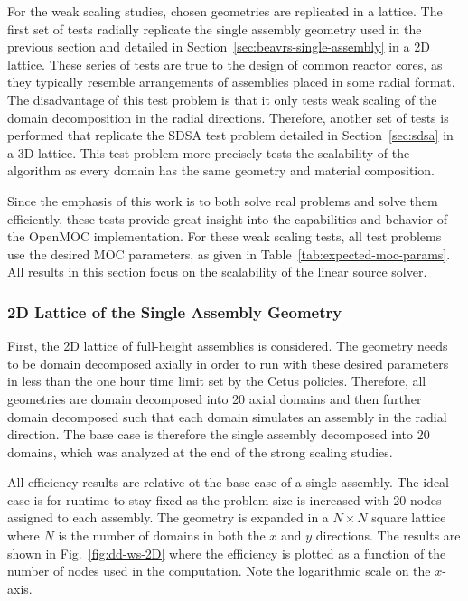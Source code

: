 For the weak scaling studies, chosen geometries are replicated in a lattice. The first set of tests radially replicate the single assembly geometry used in the previous section and detailed in Section~\ref{sec:beavrs-single-assembly} in a 2D lattice. These series of tests are true to the design of common reactor cores, as they typically resemble arrangements of assemblies placed in some radial format. The disadvantage of this test problem is that it only tests weak scaling of the domain decomposition in the radial directions. Therefore, another set of tests is performed that replicate the SDSA test problem detailed in Section~\ref{sec:sdsa} in a 3D lattice. This test problem more precisely tests the scalability of the algorithm as every domain has the same geometry and material composition. 

Since the emphasis of this work is to both solve real problems and solve them efficiently, these tests provide great insight into the capabilities and behavior of the OpenMOC implementation. For these weak scaling tests, all test problems use the desired \ac{MOC} parameters, as given in Table~\ref{tab:expected-moc-params}. All results in this section focus on the scalability of the linear source solver.
 

\subsubsection{2D Lattice of the Single Assembly Geometry}

First, the 2D lattice of full-height assemblies is considered. The geometry needs to be domain decomposed axially in order to run with these desired parameters in less than the one hour time limit set by the Cetus policies. Therefore, all geometries are domain decomposed into 20 axial domains and then further domain decomposed such that each domain simulates an assembly in the radial direction. The base case is therefore the single assembly decomposed into 20 domains, which was analyzed at the end of the strong scaling studies.

All efficiency results are relative ot the base case of a single assembly. The ideal case is for runtime to stay fixed as the problem size is increased with 20 nodes assigned to each assembly. The geometry is expanded in a $N \times N$ square lattice where $N$ is the number of domains in both the $x$ and $y$ directions. The results are shown in Fig.~\ref{fig:dd-ws-2D} where the efficiency is plotted as a function of the number of nodes used in the computation. Note the logarithmic scale on the $x$-axis.

